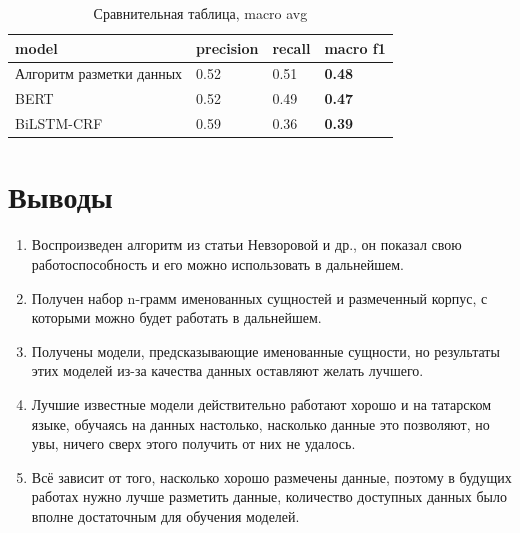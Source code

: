 \begin{table}[h!]

\begin{tabular}{| l | l | l | l |}
\hline

model &precision  &  recall & \textbf{macro f1} \\
\hline
Алгоритм разметки данных & 0.52 & 0.51& \textbf{0.48} \\ 
\hline
BERT &  0.52 & 0.49 & \textbf{0.47} \\ 
\hline
BiLSTM-CRF &  0.59 & 0.36 & \textbf{0.39} \\
\hline
\end{tabular}

\caption{Сравнительная таблица,  macro avg}
\label{table:average}

\end{table}







\newpage

\section{Выводы}

\begin{enumerate}
\item Воспроизведен алгоритм из статьи Невзоровой и др., он показал свою работоспособность и его можно использовать в дальнейшем. %
\item Получен набор n-грамм именованных сущностей и размеченный корпус, с которыми можно будет работать в дальнейшем.
\item Получены модели, предсказывающие именованные сущности, но результаты этих моделей из-за качества данных оставляют желать лучшего.
\item Лучшие известные модели действительно работают хорошо и на татарском языке, обучаясь на данных настолько, насколько данные это позволяют, но увы, ничего сверх этого получить от них не удалось. 
\item Всё зависит от того, насколько хорошо размечены данные, поэтому в будущих работах нужно лучше разметить данные, количество доступных данных было вполне достаточным для обучения моделей.
\end{enumerate}























